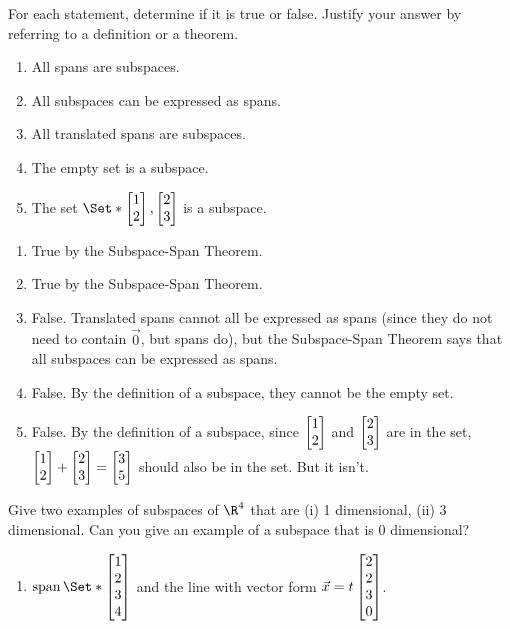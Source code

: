 \begin{exercises}
\begin{problist}
		\prob  For each statement, determine if it is true or false.
		Justify your answer by referring to a definition or a theorem.
		\begin{enumerate}
			\item All spans are subspaces.
			\item All subspaces can be expressed as spans.
			\item All translated spans are subspaces.
			\item The empty set is a subspace.
			\item The set $\Set*{\mat{1\\2}, \mat{2\\3}}$ is a subspace.
		\end{enumerate}
		\begin{solution}
			\begin{enumerate}
				\item True by the Subspace-Span Theorem.

				\item True by the Subspace-Span Theorem.

				\item False. Translated spans cannot all be expressed as spans (since they do not need to contain $\vec 0$, but spans do), but the Subspace-Span Theorem says that all subspaces can be expressed as spans.

				\item False. By the definition of a subspace, they cannot be the empty set.

				\item False. By the definition of a subspace, since $\mat{1\\2}$ and $\mat{2\\3}$ are in the set, $\mat{1\\2}+\mat{2\\3}=\mat{3\\5}$ should also be in the set. But it isn't.
\end{enumerate}
		\end{solution}

		\prob Give two examples of subspaces of $\R^4$ that are (i) 1 dimensional, (ii)
		3 dimensional. Can you give an example of a subspace that is 0 dimensional? 
		\label{PROB-GIVE-EXAMPLES}
		\begin{solution}
			\begin{enumerate}[label=(\roman*)]
				\item $\Span\Set*{\mat{1\\2\\3\\4}}$ and the line with vector form $\vec x=t\mat{2\\2\\3\\0}$.


\end{enumerate}
\end{solution}
\end{problist}
\end{exercises}
